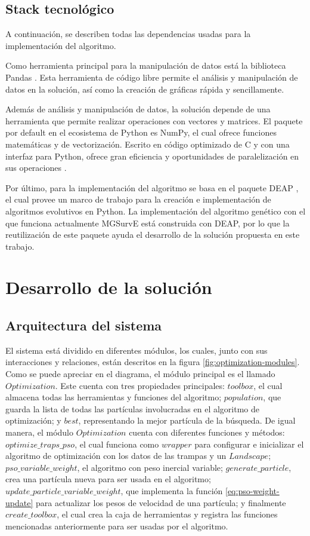 \documentclass[letterpaper]{report}
\begin{document}
    \subsection{Stack tecnológico}
    A continuación, se describen todas las dependencias usadas para la
    implementación del algoritmo.

    Como herramienta principal para la manipulación de datos está la biblioteca
    Pandas \cite{PandasDocs}. Esta herramienta de código libre permite el
    análisis y manipulación de datos en la solución, así como la creación de
    gráficas rápida y sencillamente.

    Además de análisis y manipulación de datos, la solución depende de una
    herramienta que permite realizar operaciones con vectores y matrices. El
    paquete por default en el ecosistema de Python es NumPy, el cual ofrece
    funciones matemáticas y de vectorización. Escrito en código optimizado de C
    y con una interfaz para Python, ofrece gran eficiencia y oportunidades de 
    paralelización en sus operaciones \cite{NumPyDocs}.

    Por último, para la implementación del algoritmo se basa en el paquete DEAP
    \cite{DEAPDocs}, el cual provee un marco de trabajo para la creación e
    implementación de algoritmos evolutivos en Python. La implementación del
    algoritmo genético con el que funciona actualmente MGSurvE está construida
    con DEAP, por lo que la reutilización de este paquete ayuda el desarrollo de
    la solución propuesta en este trabajo.

  \section{Desarrollo de la solución}
    \subsection{Arquitectura del sistema}

    El sistema está dividido en diferentes módulos, los cuales, junto con sus
    interacciones y relaciones, están descritos en la figura
    \ref{fig:optimization-modules}. Como se puede apreciar en el diagrama, el
    módulo principal es el llamado $Optimization$. Este cuenta con tres
    propiedades principales: $toolbox$, el cual almacena todas las herramientas
    y funciones del algoritmo; $population$, que guarda la lista de todas las
    partículas involucradas en el algoritmo de optimización; y $best$,
    representando la mejor partícula de la búsqueda. De igual manera, el módulo
    $Optimization$ cuenta con diferentes funciones y métodos:
    $optimize\_traps\_pso$, el cual funciona como $wrapper$ para configurar e
    inicializar el algoritmo de optimización con los datos de las trampas y un
    $Landscape$; $pso\_variable\_weight$, el algoritmo con peso inercial
    variable; $generate\_particle$, crea una partícula nueva para ser usada en
    el algoritmo; $update\_particle\_variable\_weight$, que implementa la
    función \ref{eq:pso-weight-update} para actualizar los pesos de velocidad de
    una partícula; y finalmente $create\_toolbox$, el cual crea la caja de
    herramientas y registra las funciones mencionadas anteriormente para ser
    usadas por el algoritmo.
\end{document}
